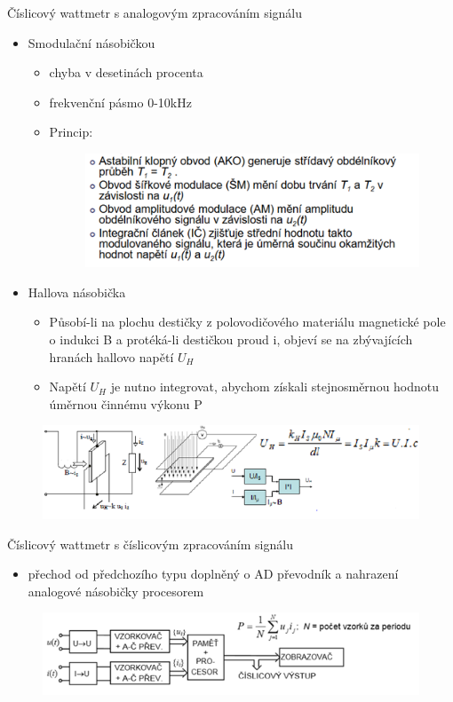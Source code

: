 Číslicový wattmetr s analogovým zpracováním signálu
\begin{itemize}
    \item Smodulační násobičkou
    \begin{itemize}
        \item chyba v desetinách procenta
        \item frekvenční pásmo 0-10kHz 
        \item Princip:
        \begin{figure}[H]
            \includegraphics*[scale  = 1]{images/wattAnalogPrincip.png}
        \end{figure}
    \end{itemize}
\newpage

    \item Hallova násobička
    \begin{itemize}
        \item Působí-li na plochu destičky z polovodičového materiálu magnetické pole o indukci B a protéká-li destičkou proud i, objeví se na zbývajících hranách hallovo napětí $U_H$
        \item Napětí $U_H$ je nutno integrovat, abychom získali stejnosměrnou hodnotu úměrnou činnému výkonu P
    \end{itemize}
\end{itemize}
\begin{figure}[H]
    \includegraphics*[scale  = 1.3]{images/wattHallovaNasobicka.png}
\end{figure}

Číslicový wattmetr s číslicovým zpracováním signálu
\begin{itemize}
    \item přechod od předchozího typu doplněný o AD převodník a nahrazení analogové násobičky procesorem
\end{itemize}
\begin{figure}[H]
    \includegraphics*[scale  = 1.3]{images/wattCislicovySchema.png}
\end{figure}

